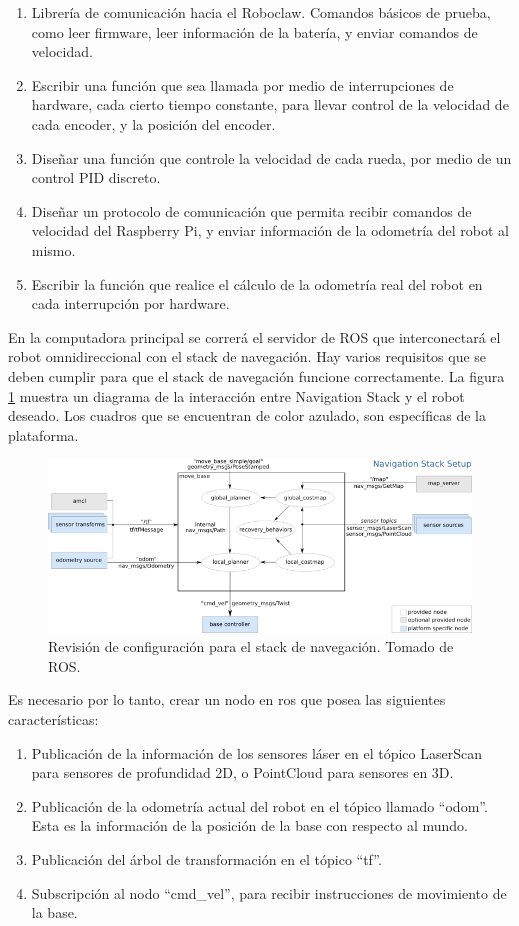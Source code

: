 \begin{enumerate}
\item Librería de comunicación hacia el Roboclaw. Comandos básicos de prueba, como leer firmware, leer información de la batería, y enviar comandos de velocidad.
\item Escribir una función que sea llamada por medio de interrupciones de hardware, cada cierto tiempo constante, para llevar control de la velocidad de cada encoder, y la posición del encoder.
\item Diseñar una función que controle la velocidad de cada rueda, por medio de un control PID discreto.
\item Diseñar un protocolo de comunicación que permita recibir comandos de velocidad del Raspberry Pi, y enviar información de la odometría del robot al mismo.
\item Escribir la función que realice el cálculo de la odometría real del robot en cada interrupción por hardware.
\end{enumerate}

En la computadora principal se correrá el servidor de ROS que interconectará el robot omnidireccional con el stack de navegación. Hay varios requisitos que se deben cumplir para que el stack de navegación funcione correctamente. La figura \ref{F:navigation_stack} muestra un diagrama de la interacción entre Navigation Stack y el robot deseado. Los cuadros que se encuentran de color azulado, son específicas de la plataforma.

\begin{figure}[H]
\centering
\includegraphics[scale=0.7]{imagenes/overview_tf_small.png}
\caption{Revisión de configuración para el stack de navegación. Tomado de ROS.}
\label{F:navigation_stack}
\end{figure}

Es necesario por lo tanto, crear un nodo en ros que posea las siguientes características:

\begin{enumerate}
\item Publicación de la información de los sensores láser en el tópico LaserScan para sensores de profundidad 2D, o PointCloud para sensores en 3D.
\item Publicación de la odometría actual del robot en el tópico llamado ``odom''. Esta es la información de la posición de la base con respecto al mundo.
\item Publicación del árbol de transformación en el tópico ``tf''.
\item Subscripción al nodo ``cmd\_vel'', para recibir instrucciones de movimiento de la base.
\end{enumerate}

